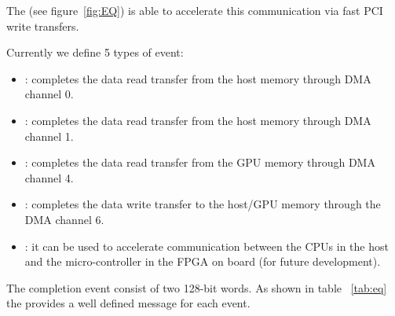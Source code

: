 The  (see figure~\ref{fig:EQ}) is able to
accelerate this communication via fast PCI write transfers.


Currently we define 5 types of event:

\begin{itemize}
\item \TXaevent:  completes the data read transfer from
the host memory through DMA channel 0.
\item \TXbevent:  completes the data read transfer from
the host memory through DMA channel 1.
\item \GPUTXevent:  completes the data read transfer
from the GPU memory through DMA channel 4.
\item \RXevent:  completes the data write transfer to the
host/GPU memory through the DMA channel 6.
\item \niosevent: it can be used to accelerate communication between
the CPUs in the host and the \mbox{micro-controller} in the FPGA on
board (for future development).
\end{itemize}


The completion event consist of two 128-bit words. As shown in table
~\ref{tab:eq} the \SIprotocol provides a well defined message for each
event.


